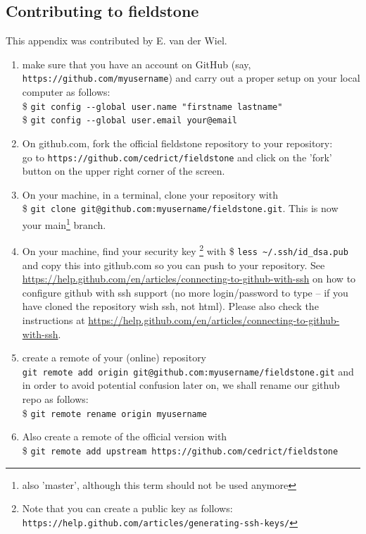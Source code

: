 \subsection{Contributing to fieldstone}

\begin{mdframed}[backgroundcolor=red!5]
This appendix was contributed by E. van der Wiel.
\end{mdframed}


\begin{enumerate}
\item make sure that you  have an account on GitHub (say, \verb"https://github.com/myusername") 
and carry out a proper setup on your local computer as follows:\\
\$ \verb'git config --global user.name "firstname lastname" '\\
\$ \verb'git config --global user.email your@email'

\item On github.com, fork the official fieldstone 
repository to your repository:\\
go to \verb"https://github.com/cedrict/fieldstone" 
and click on the 'fork' button on the upper right corner of the screen.
\item On your machine, in a terminal, clone your repository with \\
\$ \verb"git clone git@github.com:myusername/fieldstone.git". This is now your main\footnote{also 'master', although this term should not be used anymore} branch.

\item On your machine, find your security key \footnote{
Note that you can create a public key as follows: 
{\tt https://help.github.com/articles/generating-ssh-keys/}}
 with \$ \verb"less ~/.ssh/id_dsa.pub" and copy this into github.com 
so you can push to your repository. See \url{https://help.github.com/en/articles/connecting-to-github-with-ssh} on how to configure github with ssh support (no more login/password to type -- if you have cloned the repository wish ssh, not html).
Please also check the instructions at \url{https://help.github.com/en/articles/connecting-to-github-with-ssh}.  
 
\item create a remote of your (online) repository\\
\verb"git remote add origin git@github.com:myusername/fieldstone.git"
and in order to avoid potential confusion later on, we shall rename our github repo as follows:\\
\$ \verb"git remote rename origin myusername" 

\item Also create a remote of the official version with\\
\$ \verb"git remote add upstream https://github.com/cedrict/fieldstone"

\end{enumerate}


